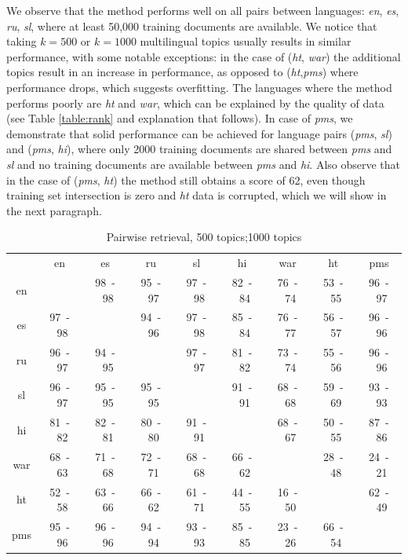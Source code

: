 \documentclass[twoside,11pt]{article}
\begin{document}
We observe that the method performs well on all pairs between languages: \emph{en}, \emph{es}, \emph{ru}, \emph{sl}, where at least 50,000 training documents are available. We notice that taking $k = 500$ or $k = 1000$ multilingual topics usually results in similar performance, with some notable exceptions: in the case of (\emph{ht}, \emph{war}) the additional topics result in an increase in performance, as opposed to (\emph{ht},\emph{pms}) where performance drops, which suggests overfitting. The languages where the method performs poorly are \emph{ht} and \emph{war}, which can be explained by the quality of data (see Table \ref{table:rank} and explanation that follows). In case of \emph{pms}, we demonstrate that solid performance can be achieved for language pairs (\emph{pms}, \emph{sl}) and (\emph{pms}, \emph{hi}), where only 2000 training documents are shared between \emph{pms} and \emph{sl} and no training documents are available between \emph{pms} and \emph{hi}. Also observe that in the case of (\emph{pms}, \emph{ht}) the method still obtains a score of 62, even though training set intersection is zero and \emph{ht} data is corrupted, which we will show in the next paragraph.
{
\renewcommand\tabcolsep{3pt}
\begin{table}[h!]
\caption{Pairwise retrieval, 500 topics;1000 topics}\label{table:retrieval}
\begin{center}
\begin{tabular}{|c|c|c|c|c|c|c|c|c|}
\cline{1-9}
&	en&	es&	ru&	sl&	hi&	war&	ht&	pms\\\cline{1-9}
en&	    &	98~-~98&	95~-~97&	97~-~98&	82~-~84&	76~-~74&	53~-~55&	 96~-~97\\
\cline{1-9}
es&	97~-~98&	&	94~-~96&	97~-~98&	85~-~84&	76~-~77&	56~-~57&	96~-~96\\
\cline{1-9}
ru&	96~-~97&	94~-~95&	&	97~-~97&	81~-~82&	73~-~74&	55~-~56&	96~-~96\\
\cline{1-9}
sl&	96~-~97&	95~-~95&	95~-~95&	&	91~-~91&	68~-~68&	59~-~69&	93~-~93\\
\cline{1-9}
hi&	81~-~82&	82~-~81&	80~-~80&	91~-~91&	&	68~-~67&	50~-~55&	87~-~86\\
\cline{1-9}
war&	68~-~63&	71~-~68&	72~-~71&	68~-~68&	66~-~62&	&	28~-~48&	 24~-~21\\
\cline{1-9}
ht&	52~-~58&	63~-~66&	66~-~62&	61~-~71&	44~-~55&	16~-~50&	&	62~-~49\\
\cline{1-9}
pms&	95~-~96&	96~-~96&	94~-~94&	93~-~93&	85~-~85&	23~-~26&	66~-~54&	 \\
\cline{1-9}
\end{tabular}
\end{center}
\end{table}
}
\end{document}
